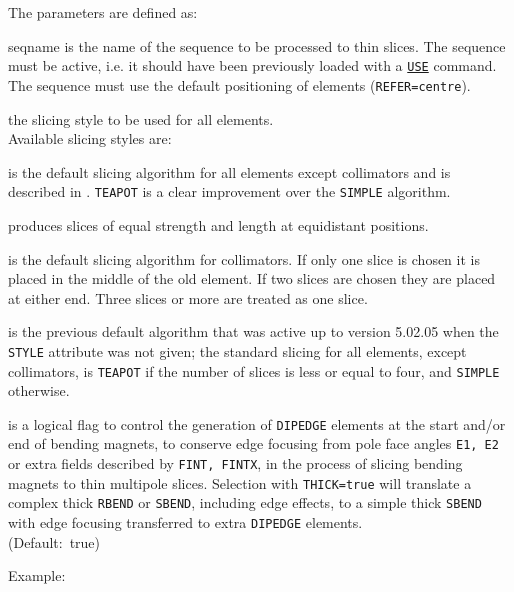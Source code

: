 The parameters are defined as: 
\begin{madlist}
    seqname is the name of the sequence to be
   processed to thin slices. The sequence must be active, i.e. it should
   have been previously loaded with a \hyperref[sec:use]{\texttt{USE}} command.  
   The sequence must use the default positioning of elements
   ({\texttt{REFER=centre}}). 

    the slicing style to be used for all elements. \\
   Available slicing styles are: 

   \begin{madlist}
   	 is the default slicing algorithm for all elements 
   	except collimators and is described in \cite{burkhardt2013}. 
   	\texttt{TEAPOT} is a clear improvement over the \texttt{SIMPLE} algorithm.
   	
   	 produces slices of equal strength and length at equidistant
   	positions.
   	
   	 is the default slicing algorithm for collimators. 
   	If only one slice is chosen it is placed in the middle of the old
   	element. If two slices are chosen they are placed at either
   	end. Three slices or more are treated as one slice. 
   	
   	 is the previous default algorithm 
   	that was active up to version 5.02.05 when the \texttt{STYLE} 
   	attribute was not given; the standard slicing for all
   	elements, except collimators, is \texttt{TEAPOT} if the number
   	of slices is less or equal to four, and \texttt{SIMPLE} otherwise.
   
   \end{madlist}
   
    is a logical flag to control the generation of
   \texttt{DIPEDGE} elements at the start and/or end of bending magnets,
   to conserve edge focusing from pole face angles \texttt{E1, E2}
   or extra fields described by \texttt{FINT, FINTX}, in the
   process of slicing bending magnets to thin multipole slices.   
   Selection with \texttt{THICK=true} will translate a complex thick 
   \texttt{RBEND} or \texttt{SBEND}, including edge effects, to a simple
   thick \texttt{SBEND} with edge focusing transferred to extra 
   \texttt{DIPEDGE} elements. \\ 
   (Default:~true)
\end{madlist}

Example:

